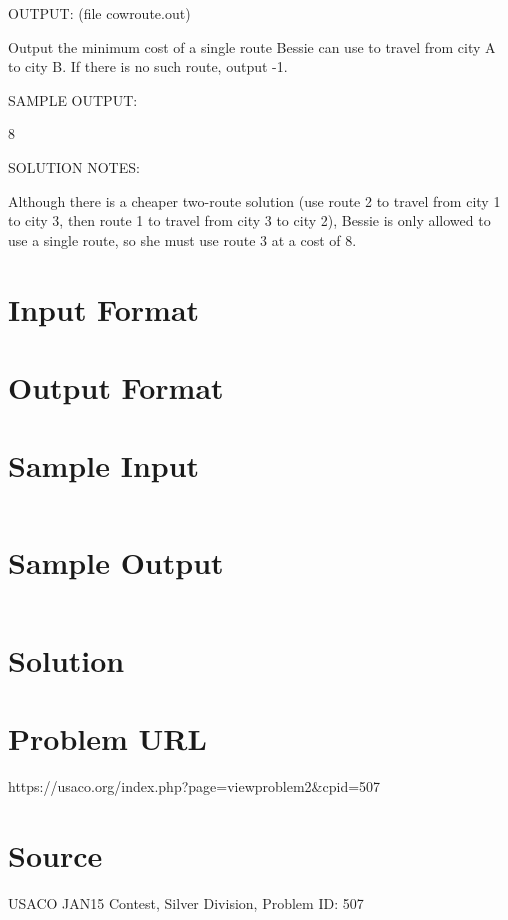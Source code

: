 \documentclass[12pt]{article}
\begin{document}
OUTPUT: (file cowroute.out)

Output the minimum cost of a single route Bessie can use to travel
from city A to city B.  If there is no such route, output -1.

SAMPLE OUTPUT:

8

SOLUTION NOTES:

Although there is a cheaper two-route solution (use route 2 to travel
from city 1 to city 3, then route 1 to travel from city 3 to city 2),
Bessie is only allowed to use a single route, so she must use route 3
at a cost of 8.




\section*{Input Format}


\section*{Output Format}


\section*{Sample Input}
\begin{verbatim}

\end{verbatim}

\section*{Sample Output}
\begin{verbatim}

\end{verbatim}

\section*{Solution}


\section*{Problem URL}
https://usaco.org/index.php?page=viewproblem2&cpid=507

\section*{Source}
USACO JAN15 Contest, Silver Division, Problem ID: 507
\end{document}
